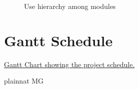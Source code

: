 \documentclass[12pt, titlepage]{article}
\begin{document}
\begin{figure}[H]
\centering
\caption{Use hierarchy among modules}
\label{FigUH}
\end{figure}

\section{Gantt Schedule}

   \href{3XA3 Gantt Chart.pdf}{Gantt Chart showing the project schedule.}



 {plainnat}
 {MG}
\end{document}
